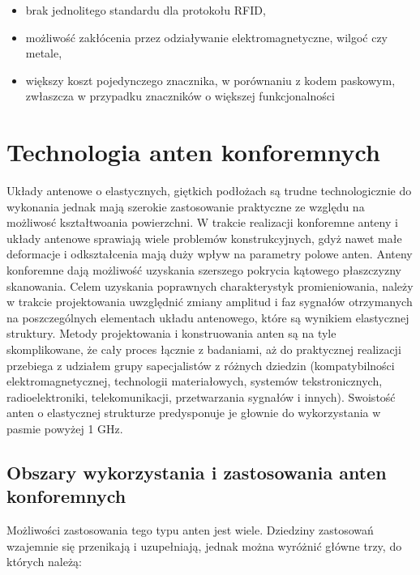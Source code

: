 \begin{itemize}\setlength{\itemsep}{0pt}

	\item brak jednolitego standardu dla protokołu RFID,
	
	\item możliwość zakłócenia przez odziaływanie elektromagnetyczne, wilgoć czy metale,
 	
 	\item większy koszt pojedynczego znacznika, w porównaniu z kodem paskowym, zwłaszcza w przypadku znaczników o większej funkcjonalności 

\end{itemize}





\chapter{Technologia anten konforemnych}

Układy antenowe o elastycznych, giętkich podłożach są trudne technologicznie do wykonania jednak mają szerokie zastosowanie praktyczne ze względu na możliwosć kształtwoania powierzchni. 
W trakcie realizacji konforemne anteny i układy antenowe sprawiają wiele problemów konstrukcyjnych, gdyż nawet małe deformacje i odkształcenia mają duży wpływ na parametry polowe anten. 
Anteny konforemne dają możliwość uzyskania szerszego pokrycia kątowego płaszczyzny skanowania. Celem uzyskania poprawnych charakterystyk promieniowania, należy w trakcie projektowania uwzględnić zmiany amplitud i faz sygnałów otrzymanych na poszczególnych elementach układu antenowego, które są wynikiem elastycznej struktury.    
Metody projektowania i konstruowania anten są na tyle skomplikowane, że cały proces łącznie z badaniami, aż do praktycznej realizacji przebiega z udziałem grupy sapecjalistów z różnych dziedzin (kompatybilności elektromagnetycznej, technologii materiałowych, systemów tekstronicznych, radioelektroniki, telekomunikacji, przetwarzania sygnałów i innych). Swoistość anten o elastycznej strukturze predysponuje je głownie do wykorzystania w pasmie powyżej 1 GHz.     

\section{Obszary wykorzystania i zastosowania anten konforemnych}

Możliwości zastosowania tego typu anten jest wiele. Dziedziny zastosowań wzajemnie się przenikają i uzupełniają, jednak można wyróżnić główne trzy, do których należą:

